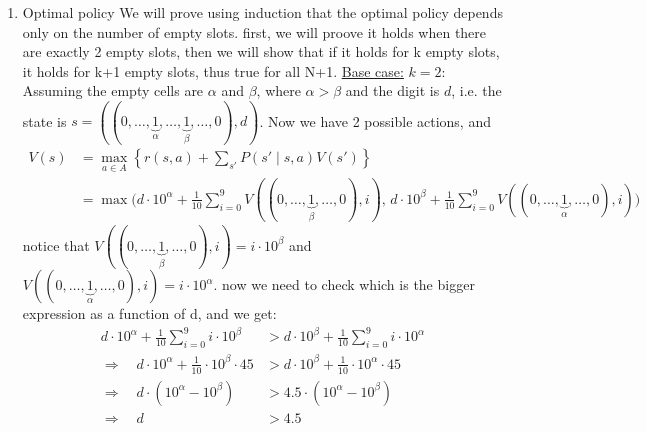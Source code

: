 \documentclass{assignmeownt}
\begin{document}
\begin{enumerate}
\item Optimal policy
\newline
We will prove using induction that the optimal policy depends only on the number of empty slots.
\newline
first, we will proove it holds when there are exactly 2 empty slots, then we will show that if it holds for k empty slots, it holds for k+1 empty slots, thus true for all N+1.
\newline
\underline{Base case:} $k=2$: Assuming the empty cells are $\alpha$ and $\beta$, where $\alpha > \beta$ and the digit is $d$, 
\newline i.e. the state is $s=((0, \dots, \underbrace{1}_{{\alpha}}, \dots, \underbrace{1}_{{\beta}}, \dots, 0), d)$. Now we have 2 possible actions, and \newline
\begin{equation}
    \begin{aligned}
        V(s) &= \max_{a \in A} \left\{ r(s, a) + \sum_{s'} P(s' \mid s, a) V(s') \right\} \\
        &= \max \Biggl( d \cdot 10^{\alpha} + \frac{1}{10} \sum_{i=0}^{9} V((0, \dots, \underbrace{1}_{\beta}, \dots, 0), i), \,
        d \cdot 10^{\beta} + \frac{1}{10} \sum_{i=0}^{9} V((0, \dots, \underbrace{1}_{\alpha}, \dots, 0), i) \Biggr)
    \end{aligned}
\end{equation}
\newline
notice that $ V((0, \dots, \underbrace{1}_{\beta}, \dots, 0), i) = i \cdot 10^{\beta} $ and $ V((0, \dots, \underbrace{1}_{\alpha
}, \dots, 0), i) = i \cdot 10^{\alpha} $.
\newline
now we need to check which is the bigger expression as a function of d, and we get:
\newline
\begin{equation}
    \begin{aligned}
        d \cdot 10^{\alpha} + \frac{1}{10} \sum_{i=0}^{9} i \cdot 10^{\beta} &> d \cdot 10^{\beta} + \frac{1}{10} \sum_{i=0}^{9} i \cdot 10^{\alpha} \\
        \Rightarrow \quad d \cdot 10^{\alpha} + \frac{1}{10} \cdot 10^{\beta} \cdot 45 &> d \cdot 10^{\beta} + \frac{1}{10} \cdot 10^{\alpha} \cdot 45 \\
        \Rightarrow \quad d \cdot (10^{\alpha} - 10^{\beta}) &> 4.5 \cdot (10^{\alpha} - 10^{\beta}) \\
        \Rightarrow \quad d &> 4.5
    \end{aligned}

\end{equation}
\end{enumerate}
\end{document}
